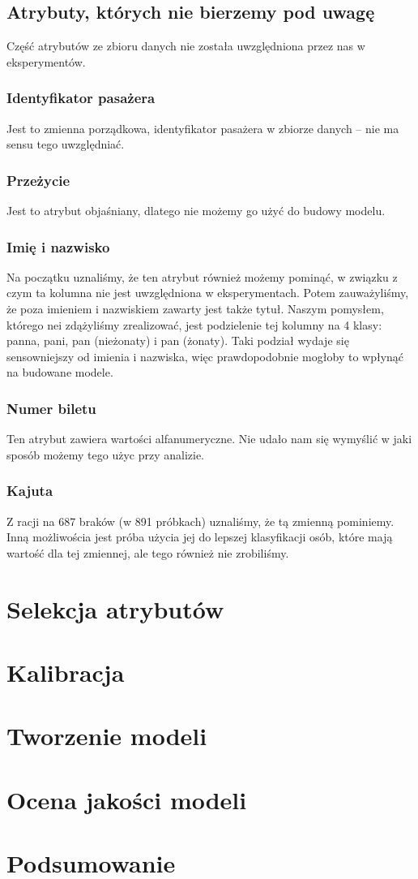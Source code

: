 \documentclass{article}
\begin{document}
\subsection{Atrybuty, których nie bierzemy pod uwagę}
Część atrybutów ze zbioru danych nie została uwzględniona przez nas w eksperymentów.

\subsubsection{Identyfikator pasażera}
Jest to zmienna porządkowa, identyfikator pasażera w zbiorze danych -- nie ma sensu tego uwzględniać.

\subsubsection{Przeżycie}
Jest to atrybut objaśniany, dlatego nie możemy go użyć do budowy modelu.

\subsubsection{Imię i nazwisko}
Na początku uznaliśmy, że ten atrybut również możemy pominąć, w związku z czym ta kolumna nie jest uwzględniona w eksperymentach.
Potem zauważyliśmy, że poza imieniem i nazwiskiem zawarty jest także tytuł. Naszym pomysłem, którego nei zdążyliśmy zrealizować,
jest podzielenie tej kolumny na 4 klasy: panna, pani, pan (nieżonaty) i pan (żonaty). Taki podział wydaje się sensowniejszy od imienia i nazwiska,
więc prawdopodobnie mogłoby to wpłynąć na budowane modele.

\subsubsection{Numer biletu}
Ten atrybut zawiera wartości alfanumeryczne. Nie udało nam się wymyślić w jaki sposób możemy tego użyc przy analizie.

\subsubsection{Kajuta}
Z racji na 687 braków (w 891 próbkach) uznaliśmy, że tą zmienną pominiemy.
Inną możliwościa jest próba użycia jej do lepszej klasyfikacji osób, które mają wartość dla tej zmiennej, ale tego również nie zrobiliśmy.

\section{Selekcja atrybutów}
\section{Kalibracja}
\section{Tworzenie modeli}
\section{Ocena jakości modeli}
\section{Podsumowanie}
\end{document}
